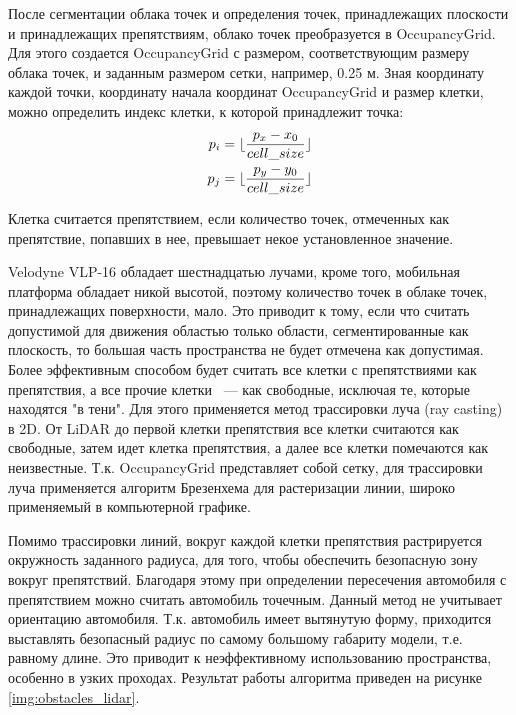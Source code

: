 После сегментации облака точек и определения точек, принадлежащих плоскости и принадлежащих препятствиям, облако точек
преобразуется в OccupancyGrid. Для этого создается OccupancyGrid с размером, соответствующим размеру облака точек, и
заданным размером сетки, например, 0.25 м. Зная координату каждой точки, координату начала координат OccupancyGrid и
размер клетки, можно определить индекс клетки, к которой принадлежит точка:
\begin{align}
    p_i &= \lfloor\frac{p_x - x_0}{cell\_size}\rfloor \\
    p_j &= \lfloor\frac{p_y - y_0}{cell\_size}\rfloor
\end{align}

Клетка считается препятствием, если количество точек, отмеченных как препятствие, попавших в нее, превышает некое
установленное значение.

Velodyne VLP-16 обладает шестнадцатью лучами, кроме того, мобильная платформа обладает никой высотой, поэтому
количество точек в облаке точек, принадлежащих поверхности, мало. Это приводит к тому, если что считать допустимой для
движения областью только области, сегментированные как плоскость, то большая часть пространства не будет отмечена
как допустимая. Более эффективным способом будет считать все клетки с препятствиями как препятствия, а все прочие
клетки ~--- как свободные, исключая те, которые находятся "в тени". Для этого применяется метод трассировки луча
(ray casting) в 2D. От LiDAR до первой клетки препятствия все клетки считаются как свободные, затем идет клетка
препятствия, а далее все клетки помечаются как неизвестные. Т.к. OccupancyGrid представляет собой сетку, для трассировки
луча применяется алгоритм Брезенхема для растеризации линии, широко применяемый в компьютерной графике.

Помимо трассировки линий, вокруг каждой клетки препятствия растрируется окружность заданного радиуса, для того, чтобы
обеспечить безопасную зону вокруг препятствий. Благодаря этому при определении пересечения автомобиля с препятствием
можно считать автомобиль точечным. Данный метод не учитывает ориентацию автомобиля. Т.к. автомобиль имеет вытянутую
форму, приходится выставлять безопасный радиус по самому большому габариту модели, т.е. равному длине. Это приводит
к неэффективному использованию пространства, особенно в узких проходах. Результат работы алгоритма приведен на
рисунке \ref{img:obstacles_lidar}.

